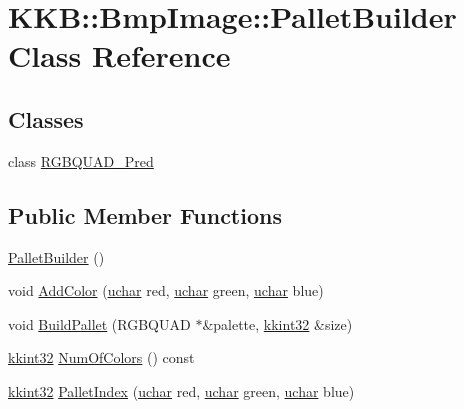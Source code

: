 \hypertarget{class_bmp_image_1_1_pallet_builder}{}\section{K\+KB\+:\+:Bmp\+Image\+:\+:Pallet\+Builder Class Reference}
\label{class_bmp_image_1_1_pallet_builder}
\subsection*{Classes}
\begin{DoxyCompactItemize}
\item 
class \hyperlink{class_bmp_image_1_1_pallet_builder_1_1_r_g_b_q_u_a_d___pred}{R\+G\+B\+Q\+U\+A\+D\+\_\+\+Pred}
\end{DoxyCompactItemize}
\subsection*{Public Member Functions}
\begin{DoxyCompactItemize}
\item 
\hyperlink{class_bmp_image_1_1_pallet_builder_a533d45b379be19bff962afb7c545763e}{Pallet\+Builder} ()
\item 
void \hyperlink{class_bmp_image_1_1_pallet_builder_af1d2449887bd26ee4a189f15612e53fb}{Add\+Color} (\hyperlink{namespace_k_k_b_ace9969169bf514f9ee6185186949cdf7}{uchar} red, \hyperlink{namespace_k_k_b_ace9969169bf514f9ee6185186949cdf7}{uchar} green, \hyperlink{namespace_k_k_b_ace9969169bf514f9ee6185186949cdf7}{uchar} blue)
\item 
void \hyperlink{class_bmp_image_1_1_pallet_builder_a0ab91cd88e9f980bcdd890253239387f}{Build\+Pallet} (R\+G\+B\+Q\+U\+AD $\ast$\&palette, \hyperlink{namespace_k_k_b_a8fa4952cc84fda1de4bec1fbdd8d5b1b}{kkint32} \&size)
\item 
\hyperlink{namespace_k_k_b_a8fa4952cc84fda1de4bec1fbdd8d5b1b}{kkint32} \hyperlink{class_bmp_image_1_1_pallet_builder_a19bf752c6a8f2946e85429e2040e2feb}{Num\+Of\+Colors} () const 
\item 
\hyperlink{namespace_k_k_b_a8fa4952cc84fda1de4bec1fbdd8d5b1b}{kkint32} \hyperlink{class_bmp_image_1_1_pallet_builder_a657b00468ea9415df75086eb9d040fbc}{Pallet\+Index} (\hyperlink{namespace_k_k_b_ace9969169bf514f9ee6185186949cdf7}{uchar} red, \hyperlink{namespace_k_k_b_ace9969169bf514f9ee6185186949cdf7}{uchar} green, \hyperlink{namespace_k_k_b_ace9969169bf514f9ee6185186949cdf7}{uchar} blue)
\end{DoxyCompactItemize}



